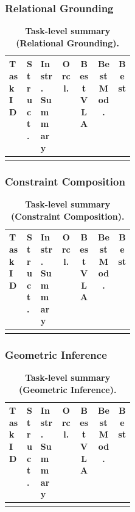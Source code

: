 \subsubsection{Relational Grounding}
\begin{table}[t]
  \centering
  \footnotesize
  \begin{tabularx}{\columnwidth}{p{0.14\linewidth} p{0.10\linewidth} X c c c c}
    \toprule
    \rowcolor{HeaderGray}
    Task ID & Struct. & Instr. Summary & Orcl. & Best VLA & Best Mod. & Best \\
    \midrule
    \TODO{} & \TODO{} & \TODO{} & \TODO{} & \TODO{} & \TODO{} & \TODO{} \\
    \bottomrule
  \end{tabularx}
  \caption{\textbf{Task-level summary (Relational Grounding).}}
  \label{tab:app_task_rg_compact}
\end{table}

\subsubsection{Constraint Composition}
\begin{table}[t]
  \centering
  \footnotesize
  \begin{tabularx}{\columnwidth}{p{0.14\linewidth} p{0.10\linewidth} X c c c c}
    \toprule
    \rowcolor{HeaderGray}
    Task ID & Struct. & Instr. Summary & Orcl. & Best VLA & Best Mod. & Best \\
    \midrule
    \TODO{} & \TODO{} & \TODO{} & \TODO{} & \TODO{} & \TODO{} & \TODO{} \\
    \bottomrule
  \end{tabularx}
  \caption{\textbf{Task-level summary (Constraint Composition).}}
  \label{tab:app_task_cc_compact}
\end{table}

\subsubsection{Geometric Inference}
\begin{table}[t]
  \centering
  \footnotesize
  \begin{tabularx}{\columnwidth}{p{0.14\linewidth} p{0.10\linewidth} X c c c c}
    \toprule
    \rowcolor{HeaderGray}
    Task ID & Struct. & Instr. Summary & Orcl. & Best VLA & Best Mod. & Best \\
    \midrule
    \TODO{} & \TODO{} & \TODO{} & \TODO{} & \TODO{} & \TODO{} & \TODO{} \\
    \bottomrule
  \end{tabularx}
  \caption{\textbf{Task-level summary (Geometric Inference).}}
  \label{tab:app_task_geo_compact}
\end{table}

